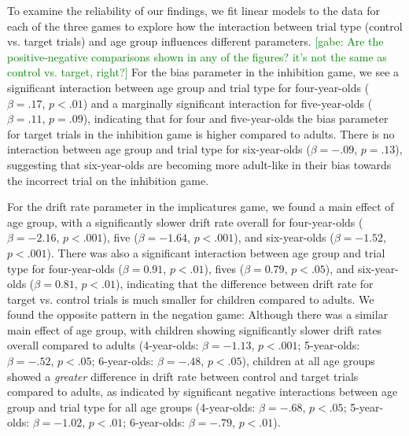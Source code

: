 \documentclass[10pt,letterpaper]{article}
\newcommand{\gabe}[1]{\textcolor{Green}{[gabe: #1]}}
\begin{document}
To examine the reliability of our findings, we fit linear models to the data for each of the three games to explore how the interaction between trial type (control vs. target trials) and age group influences different parameters. \gabe{Are the positive-negative comparisons shown in any of the figures? it's not the same as control vs. target, right?} For the bias parameter in the inhibition game, we see a significant interaction between age group and trial type for four-year-olds ($\beta = .17$, $p< .01$) and a marginally significant interaction for five-year-olds ($\beta = .11$, $p = .09$), indicating that for four and five-year-olds the bias parameter for target trials in the inhibition game is higher compared to adults.  There is no interaction between age group and trial type for six-year-olds ($\beta = -.09$, $p = .13$), suggesting that six-year-olds are becoming more adult-like in their bias towards the incorrect trial on the inhibition game.

For the drift rate parameter in the implicatures game, we found a main effect of age group, with a significantly slower drift rate overall for four-year-olds ($\beta = -2.16$, $p < .001$), five ($\beta = -1.64$, $p < .001$), and six-year-olds ($\beta = -1.52$, $p < .001$).  There was also a significant interaction between age group and trial type for four-year-olds ($\beta = 0.91$, $p <.01$), fives ($\beta = 0.79$, $p <.05$), and six-year-olds ($\beta = 0.81$, $p <.01$), indicating that the difference between drift rate for target vs. control trials is much smaller for children compared to adults.  We found the opposite pattern in the negation game: Although there was a similar main effect of age group, with children showing significantly slower drift rates overall compared to adults (4-year-olds: $\beta = -1.13$, $p <.001$; 5-year-olds: $\beta = -.52$, $p <.05$; 6-year-olds: $\beta = -.48$, $p <.05$), children at all age groups showed a \emph{greater} difference in drift rate between control and target trials compared to adults, as indicated by significant negative interactions between age group and trial type for all age groups (4-year-olds: $\beta = -.68$, $p <.05$; 5-year-olds: $\beta = -1.02$, $p <.01$; 6-year-olds: $\beta = -.79$, $p <.01$).  
\end{document}
